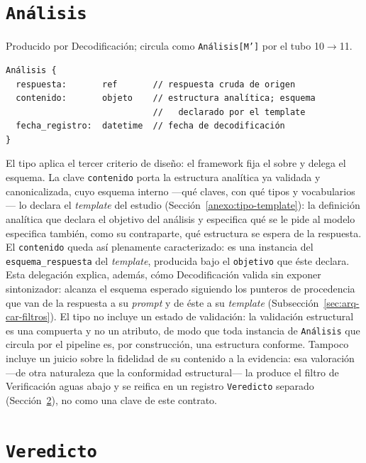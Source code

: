 \documentclass[12pt]{report}
\begin{document}
\section{\texorpdfstring{\texttt{Análisis}}{Análisis}}
\label{anexo:tipo-analisis}

Producido por Decodificación; circula como \texttt{Análisis[M']} por el tubo 10\(\to\)11.

\noindent\begin{minipage}{\linewidth}
  \begin{lstlisting}[style=tipoanexo]
Análisis {
  respuesta:       ref       // respuesta cruda de origen
  contenido:       objeto    // estructura analítica; esquema
                             //   declarado por el template
  fecha_registro:  datetime  // fecha de decodificación
}
\end{lstlisting}
\end{minipage}

El tipo aplica el tercer criterio de diseño: el framework fija el sobre y delega el esquema. La clave \texttt{contenido} porta la estructura analítica ya validada y canonicalizada, cuyo esquema interno ---qué claves, con qué tipos y vocabularios--- lo declara el \textit{template} del estudio (Sección~\ref{anexo:tipo-template}): la definición analítica que declara el objetivo del análisis y especifica qué se le pide al modelo especifica también, como su contraparte, qué estructura se espera de la respuesta. El \texttt{contenido} queda así plenamente caracterizado: es una instancia del \texttt{esquema\_respuesta} del \textit{template}, producida bajo el \texttt{objetivo} que éste declara. Esta delegación explica, además, cómo Decodificación valida sin exponer sintonizador: alcanza el esquema esperado siguiendo los punteros de procedencia que van de la respuesta a su \textit{prompt} y de éste a su \textit{template} (Subsección~\ref{sec:arq-car-filtros}). El tipo no incluye un estado de validación: la validación estructural es una compuerta y no un atributo, de modo que toda instancia de \texttt{Análisis} que circula por el pipeline es, por construcción, una estructura conforme. Tampoco incluye un juicio sobre la fidelidad de su contenido a la evidencia: esa valoración ---de otra naturaleza que la conformidad estructural--- la produce el filtro de Verificación aguas abajo y se reifica en un registro \texttt{Veredicto} separado (Sección~\ref{anexo:tipo-veredicto}), no como una clave de este contrato.

\section{\texorpdfstring{\texttt{Veredicto}}{Veredicto}}
\label{anexo:tipo-veredicto}
\end{document}
